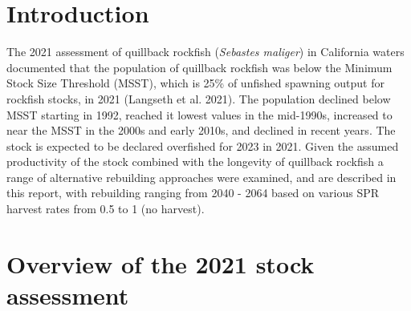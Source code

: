 \documentclass[11pt,
  english,
  letterpaper,
]{article}
\begin{document}
\setlength\parskip{0.2em plus 0.1em minus 0.2em}


\hypertarget{introduction}{%
\section{Introduction}\label{introduction}}

\leavevmode\tagmcend\tagstructend


The 2021 assessment of quillback rockfish (\emph{Sebastes maliger}) in California waters documented that the population of quillback rockfish was below the Minimum Stock Size Threshold (MSST), which is 25\% of unfished spawning output for rockfish stocks, in 2021 {(Langseth et al. 2021)\leavevmode\tagmcend\tagstructend}. The population declined below MSST starting in 1992, reached it lowest values in the mid-1990s, increased to near the MSST in the 2000s and early 2010s, and declined in recent years. The stock is expected to be declared overfished for 2023 in 2021. Given the assumed productivity of the stock combined with the longevity of quillback rockfish a range of alternative rebuilding approaches were examined, and are described in this report, with rebuilding ranging from 2040 - 2064 based on various SPR harvest rates from 0.5 to 1 (no harvest).

\leavevmode\tagmcend\tagstructend\par


\hypertarget{overview-of-the-2021-stock-assessment}{%
\section{Overview of the 2021 stock assessment}\label{overview-of-the-2021-stock-assessment}}

\leavevmode\tagmcend\tagstructend

\end{document}
